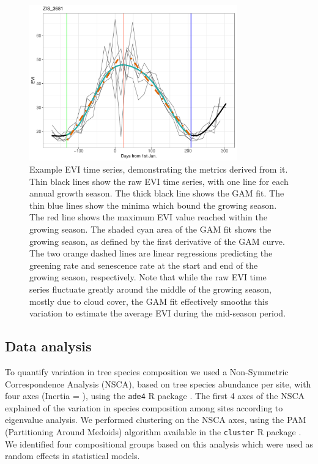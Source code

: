 \documentclass[11pt,a4paper]{article}
\begin{document}
\begin{figure}[H]
\centering
	\includegraphics[width=0.8\textwidth]{ts_example}
	\caption{Example EVI time series, demonstrating the metrics derived from it. Thin black lines show the raw EVI time series, with one line for each annual growth season. The thick black line shows the GAM fit. The thin blue lines show the minima which bound the growing season. The red line shows the maximum EVI value reached within the growing season. The shaded cyan area of the GAM fit shows the growing season, as defined by the first derivative of the GAM curve. The two orange dashed lines are linear regressions predicting the greening rate and senescence rate at the start and end of the growing season, respectively. Note that while the raw EVI time series fluctuate greatly around the middle of the growing season, mostly due to cloud cover, the GAM fit effectively smooths this variation to estimate the average EVI during the mid-season period.}
	\label{ts_example}
\end{figure}

\subsection{Data analysis}

To quantify variation in tree species composition we used a Non-Symmetric Correspondence Analysis (NSCA), based on tree species abundance per site, with four axes (Inertia = \nscaInertia{}), using the \texttt{ade4} R package \citep{ade4}. The first 4 axes of the NSCA explained \nscaPer{} of the variation in species composition among sites according to eigenvalue analysis. We performed clustering on the NSCA axes, using the PAM (Partitioning Around Medoids) algorithm available in the \texttt{cluster} R package \citep{cluster}. We identified four compositional groups based on this analysis which were used as random effects in statistical models.
\end{document}

